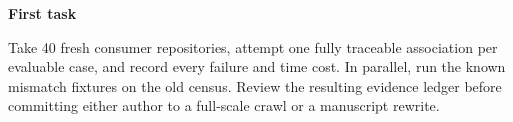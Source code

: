 \documentclass[11pt,a4paper]{article}
\newcommand{\hd}[1]{\par\textbf{\color{accent}#1}\par\nopagebreak}
\begin{document}
\hd{First task}
Take 40 fresh consumer repositories, attempt one fully traceable association per evaluable case, and record every failure and time cost. In parallel, run the known mismatch fixtures on the old census. Review the resulting evidence ledger before committing either author to a full-scale crawl or a manuscript rewrite.
\end{document}
